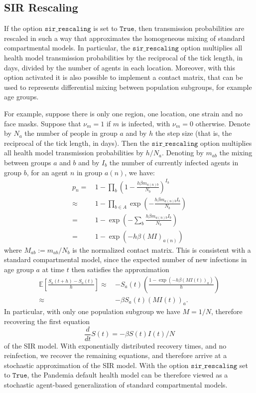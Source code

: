 \documentclass[10pt,letterpaper]{article}
\begin{document}
\subsection{SIR Rescaling}

If the option $\texttt{sir{\_}rescaling}$ is set to $\texttt{True}$, then transmission probabilities are rescaled in such a way that approximates the homogeneous mixing of standard compartmental models. In particular, the $\texttt{sir{\_}rescaling}$ option multiplies all health model transmission probabilities by the reciprocal of the tick length, in days, divided by the number of agents in each location. Moreover, with this option activated it is also possible to implement a contact matrix, that can be used to represents differential mixing between population subgroups, for example age groups.

For example, suppose there is only one region, one location, one strain and no face masks. Suppose that $\nu_m = 1$ if $m$ is infected, with $\nu_m = 0$ otherwise. Denote by $N_{a}$ the number of people in group $a$ and by $h$ the step size (that is, the reciprocal of the tick length, in days). Then the $\texttt{sir{\_}rescaling}$ option multiplies all health model transmission probabilities by $h / N_a$. Denoting by $m_{ab}$ the mixing between groups $a$ and $b$ and by $I_b$ the number of currently infected agents in group $b$, for an agent $n$ in group $a(n)$, we have:
\begin{align} \nonumber
p_n =\, & 1 - \prod_{b} \left(1 - \frac{h \beta m_{a(n) b}}{N_b}\right)^{I_b} \\ \nonumber
\approx\, & 1 - \prod_{b \in A} \exp \left(-\frac{h\beta m_{a(n)b} I_b}{N_b}\right)\\ \nonumber
 = \, & 1 - \exp \left(- \sum_{b} \frac{h\beta m_{a(n)b} I_b}{N_b}\right)\\[2mm] \nonumber
 = \, & 1 - \exp \left(- h\beta (MI)_{a(n)}\right) \nonumber
\end{align}
where $M_{ab} := m_{ab} / N_b$ is the normalized contact matrix. This is consistent with a standard compartmental model, since the expected number of new infections in age group $a$ at time $t$ then satisfies the approximation
\begin{align} \nonumber
\mathbb{E}\left[\frac{S_a(t+h) - S_a(t)}{h}\right] \approx\, & -S_a(t)\left(\frac{1 - \exp \left(- h\beta (MI(t))_{a}\right)}{h}\right)\\[2mm] \nonumber
\approx\, & -\beta S_a(t) (MI(t))_a. \nonumber
\end{align}
In particular, with only one population subgroup we have $M = 1 / N$, therefore recovering the first equation
\begin{equation*}
\frac{d}{dt} S(t) = - \beta S(t)I(t) / N
\end{equation*}
of the SIR model. With exponentially distributed recovery times, and no reinfection, we recover the remaining equations, and therefore arrive at a stochastic approximation of the SIR model. With the option $\texttt{sir{\_}rescaling}$ set to $\texttt{True}$, the Pandemia default health model can be therefore viewed as a stochastic agent-based generalization of standard compartmental models.
\end{document}
